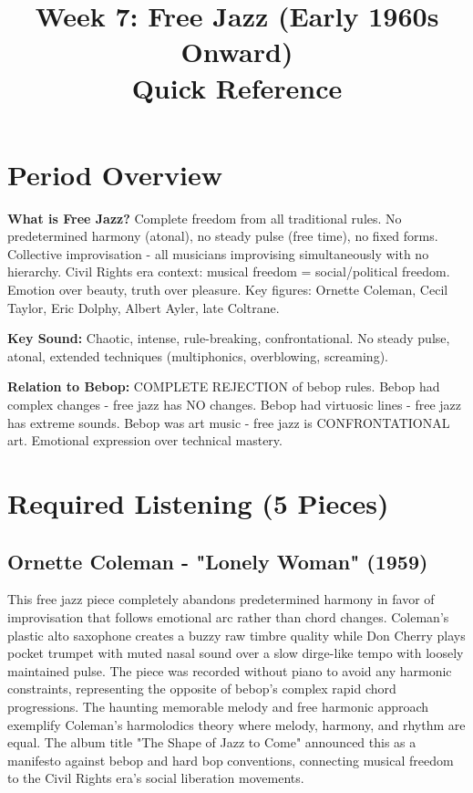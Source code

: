 \documentclass[11pt]{article}
\title{\textbf{Week 7: Free Jazz (Early 1960s Onward)} \\ \large Quick Reference}
\author{}
\date{}
\begin{document}
\maketitle

\section*{Period Overview}

\textbf{What is Free Jazz?} Complete freedom from all traditional rules. No predetermined harmony (atonal), no steady pulse (free time), no fixed forms. Collective improvisation - all musicians improvising simultaneously with no hierarchy. Civil Rights era context: musical freedom = social/political freedom. Emotion over beauty, truth over pleasure. Key figures: Ornette Coleman, Cecil Taylor, Eric Dolphy, Albert Ayler, late Coltrane.

\textbf{Key Sound:} Chaotic, intense, rule-breaking, confrontational. No steady pulse, atonal, extended techniques (multiphonics, overblowing, screaming).

\textbf{Relation to Bebop:} COMPLETE REJECTION of bebop rules. Bebop had complex changes - free jazz has NO changes. Bebop had virtuosic lines - free jazz has extreme sounds. Bebop was art music - free jazz is CONFRONTATIONAL art. Emotional expression over technical mastery.

\section*{Required Listening (5 Pieces)}

\subsection*{Ornette Coleman - "Lonely Woman" (1959)}
This free jazz piece completely abandons predetermined harmony in favor of improvisation that follows emotional arc rather than chord changes. Coleman's plastic alto saxophone creates a buzzy raw timbre quality while Don Cherry plays pocket trumpet with muted nasal sound over a slow dirge-like tempo with loosely maintained pulse. The piece was recorded without piano to avoid any harmonic constraints, representing the opposite of bebop's complex rapid chord progressions. The haunting memorable melody and free harmonic approach exemplify Coleman's harmolodics theory where melody, harmony, and rhythm are equal. The album title "The Shape of Jazz to Come" announced this as a manifesto against bebop and hard bop conventions, connecting musical freedom to the Civil Rights era's social liberation movements.
\end{document}
